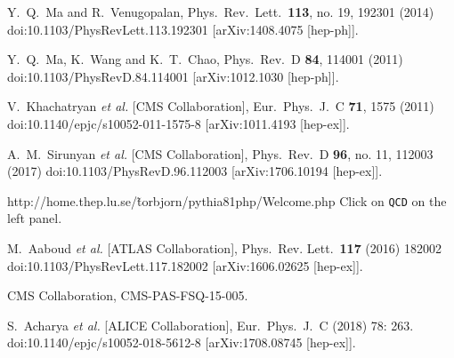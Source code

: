 \documentclass[12pt]{article}
\begin{document}
\begin{thebibliography}{1}
  Y.~Q.~Ma and R.~Venugopalan,
  Phys.\ Rev.\ Lett.\  {\bf 113}, no. 19, 192301 (2014)
  doi:10.1103/PhysRevLett.113.192301
  [arXiv:1408.4075 [hep-ph]].

  
  Y.~Q.~Ma, K.~Wang and K.~T.~Chao,
  Phys.\ Rev.\ D {\bf 84}, 114001 (2011)
  doi:10.1103/PhysRevD.84.114001
  [arXiv:1012.1030 [hep-ph]].

  V.~Khachatryan {\it et al.} [CMS Collaboration],
  Eur.\ Phys.\ J.\ C {\bf 71}, 1575 (2011)
  doi:10.1140/epjc/s10052-011-1575-8
  [arXiv:1011.4193 [hep-ex]].

  
  A.~M.~Sirunyan {\it et al.} [CMS Collaboration],
  Phys.\ Rev.\ D {\bf 96}, no. 11, 112003 (2017)
  doi:10.1103/PhysRevD.96.112003
  [arXiv:1706.10194 [hep-ex]].
   
http://home.thep.lu.se/\~torbjorn/pythia81php/Welcome.php
Click on 
{\tt QCD} on the left panel.

  M.~Aaboud {\it et al.} [ATLAS Collaboration],
  Phys.\ Rev. Lett.\ {\bf 117} (2016) 182002
  doi:10.1103/PhysRevLett.117.182002
  [arXiv:1606.02625 [hep-ex]].

  CMS Collaboration,
  CMS-PAS-FSQ-15-005.

  S.~Acharya {\it et al.} [ALICE Collaboration],
  Eur.\ Phys.\ J.\ C (2018) 78: 263.
  doi:10.1140/epjc/s10052-018-5612-8
  [arXiv:1708.08745 [hep-ex]].


\end{thebibliography}
\end{document}
